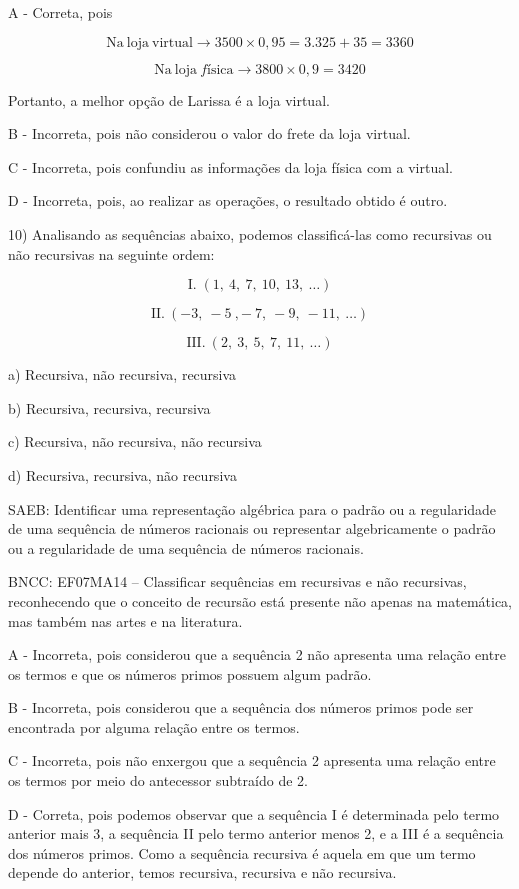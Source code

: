 A - Correta, pois

\[\text{Na}\ \text{loja}\ \text{virtual} \rightarrow 3500 \times 0,95 = 3.325 + 35 = 3360\]

\[\text{Na}\ \text{loja}\ fí\text{sica} \rightarrow 3800 \times 0,9 = 3420\]

Portanto, a melhor opção de Larissa é a loja virtual.

B - Incorreta, pois não considerou o valor do frete da loja virtual.

C - Incorreta, pois confundiu as informações da loja física com a
virtual.

D - Incorreta, pois, ao realizar as operações, o resultado obtido é
outro.

10) Analisando as sequências abaixo, podemos classificá-las como
recursivas ou não recursivas na seguinte ordem:

\[\text{I.} \; \left( 1,\ 4,\ 7,\ 10,\ 13,\ \ldots \right)\]

\[\text{II}.\ ( - 3,\  - 5\ , - \ 7,\  - 9,\  - 11,\ \ldots)\]

\[\text{III}.\ (2,\ 3,\ 5,\ 7,\ 11,\ \ldots)\]

a) Recursiva, não recursiva, recursiva

b) Recursiva, recursiva, recursiva

c) Recursiva, não recursiva, não recursiva

d) Recursiva, recursiva, não recursiva

SAEB: Identificar uma representação algébrica para o padrão ou a
regularidade de uma sequência de números racionais ou representar
algebricamente o padrão ou a regularidade de uma sequência de números
racionais.

BNCC: EF07MA14 -- Classificar sequências em recursivas e não recursivas,
reconhecendo que o conceito de recursão está presente não apenas na
matemática, mas também nas artes e na literatura.

A - Incorreta, pois considerou que a sequência 2 não apresenta uma
relação entre os termos e que os números primos possuem algum padrão.

B - Incorreta, pois considerou que a sequência dos números primos pode
ser encontrada por alguma relação entre os termos.

C - Incorreta, pois não enxergou que a sequência 2 apresenta uma relação
entre os termos por meio do antecessor subtraído de 2.

D - Correta, pois podemos observar que a sequência I é determinada pelo
termo anterior mais 3, a sequência II pelo termo anterior menos 2, e a
III é a sequência dos números primos. Como a sequência recursiva é
aquela em que um termo depende do anterior, temos recursiva, recursiva e
não recursiva.

